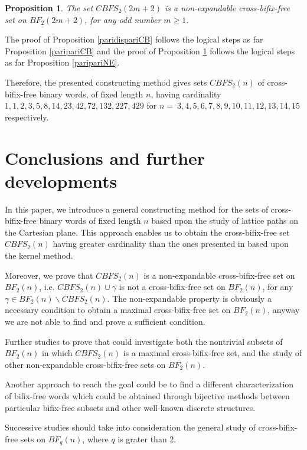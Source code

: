 \documentclass[a4paper,11pt]{article}
\newtheorem{proposition}{Proposition}[section]
\begin{document}
\begin{proposition}\label{padispariNE}
The set $CBFS_2(2m+2)$ is a non-expandable cross-bifix-free set on
$BF_2(2m+2)$, for any odd number $m \geq 1$.
\end{proposition}

The proof of Proposition \ref{paridispariCB} follows the logical
steps as far Proposition \ref{paripariCB} and the proof of
Proposition \ref{padispariNE} follows the logical steps as far
Proposition \ref{paripariNE}.

Therefore, the presented constructing method gives sets
$CBFS_2(n)$ of cross-bifix-free binary words, of fixed length $n$,
having cardinality $1,1,2,3,5,8,14,23,42,72,132,227,429$ for
$n=~3,4,5,6,7,8,9,10,11,12,13,14,15$ respectively.

\section{Conclusions and further developments}
In this paper, we introduce a general constructing method for the
sets of cross-bifix-free binary words of fixed length $n$ based
upon the study of lattice paths on the Cartesian plane. This
approach enables us to obtain the cross-bifix-free set $CBFS_2(n)$
having greater cardinality than the ones presented in \cite{1}
based upon the kernel method.

Moreover, we prove that $CBFS_2(n)$ is a non-expandable
cross-bifix-free set on $BF_2(n)$, i.e. $CBFS_2(n) \cup \gamma$ is
not a cross-bifix-free set on $BF_2(n)$, for any $\gamma \in
BF_2(n) \backslash CBFS_2(n)$. The non-expandable property is
obviously a necessary condition to obtain a maximal
cross-bifix-free set on $BF_2(n)$, anyway we are not able to find
and prove a sufficient condition.

Further studies to prove that could investigate both the
nontrivial subsets of $BF_2(n)$ in which $CBFS_2(n)$ is a maximal
cross-bifix-free set, and the study of other non-expandable
cross-bifix-free sets on $BF_2(n)$.

Another approach to reach the goal could be to find a different
characterization of bifix-free words which could be obtained
through bijective methods between particular bifix-free subsets
and other well-known discrete structures.

Successive studies should take into consideration the general
study of cross-bifix-free sets on $BF_q(n)$, where $q$ is grater
than 2.
\end{document}
